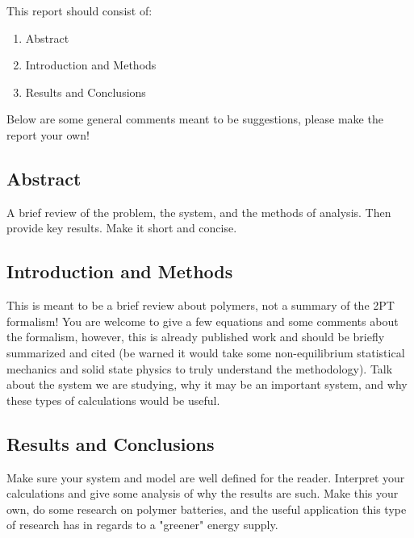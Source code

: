 \documentclass{article}
\begin{document}
This report should consist of:
\begin{enumerate}
    \item Abstract 
    \item Introduction and Methods
    \item Results and Conclusions
\end{enumerate}
Below are some general comments meant to be suggestions, please make the report your own!

\subsection*{Abstract}
A brief review of the problem, the system, and the methods of analysis. Then provide key results. Make it short and concise.

\subsection*{Introduction and Methods}
This is meant to be a brief review about polymers, not a summary of the 2PT formalism!
You are welcome to give a few equations and some comments about the formalism, however, this is already published work and should be briefly summarized and cited (be warned it would take some non-equilibrium statistical mechanics and solid state physics to truly understand the methodology).
Talk about the system we are studying, why it may be an important system, and why these types of calculations would be useful. 

\subsection*{Results and Conclusions}
Make sure your system and model are well defined for the reader.
Interpret your calculations and give some analysis of why the results are such. 
Make this your own, do some research on polymer batteries, and the useful application this type of research has in regards to a "greener" energy supply. 
\end{document}
